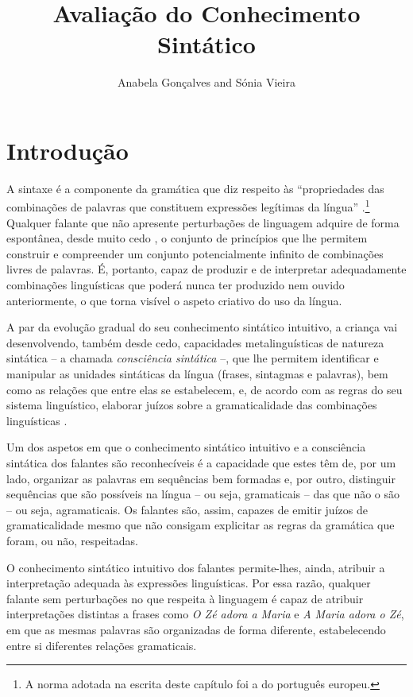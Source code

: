 \documentclass[output=paper,colorlinks,citecolor=brown,booklanguage=portuguese]{langscibook}
\title{Avaliação do Conhecimento Sintático}
\author{Anabela Gonçalves \affiliation{Universidade de Lisboa, Faculdade de Letras; Centro de Linguística da Universidade de Lisboa} and  Sónia Vieira \affiliation{University of Washington, Department of Speech and Hearing Sciences; Centro de Linguística da Universidade de Lisboa}}
\begin{document}
\maketitle

\section{Introdução}
A sintaxe é a componente da gramática que diz respeito às “propriedades das combinações de palavras que constituem expressões legítimas da língua” \citep[119]{Duarte2000}.\footnote{A norma adotada na escrita deste capítulo foi a do português europeu.}
Qualquer falante que não apresente perturbações de linguagem adquire de forma espontânea, desde muito cedo \citep{Guasti2002}, o conjunto de princípios que lhe permitem construir e compreender um conjunto potencialmente infinito de combinações livres de palavras. É, portanto, capaz de produzir e de interpretar adequadamente combinações linguísticas que poderá nunca ter produzido nem ouvido anteriormente, o que torna visível o aspeto criativo do uso da língua.

A par da evolução gradual do seu conhecimento sintático intuitivo, a criança vai desenvolvendo, também desde cedo, capacidades metalinguísticas de natureza sintática – a chamada \emph{consciência sintática} –, que lhe permitem identificar e manipular as unidades sintáticas da língua (frases, sintagmas e palavras), bem como as relações que entre elas se estabelecem, e, de acordo com as regras do seu sistema linguístico, elaborar juízos sobre a gramaticalidade das combinações linguísticas \citep{Perdigao2015, Costa2017}.  

Um dos aspetos em que o conhecimento sintático intuitivo e a consciência sintática dos falantes são reconhecíveis é a capacidade que estes têm de, por um lado, organizar as palavras em sequências bem formadas e, por outro, distinguir sequências que são possíveis na língua – ou seja, gramaticais – das que não o são – ou seja, agramaticais. Os falantes são, assim, capazes de emitir juízos de gramaticalidade mesmo que não consigam explicitar as regras da gramática que foram, ou não, respeitadas. 

O conhecimento sintático intuitivo dos falantes permite-lhes, ainda, atribuir a interpretação adequada às expressões linguísticas. Por essa razão, qualquer falante sem perturbações no que respeita à linguagem é capaz de atribuir interpretações distintas a frases como \emph{O Zé adora a Maria} e \emph{A Maria adora o Zé}, em que as mesmas palavras são organizadas de forma diferente, estabelecendo entre si diferentes relações gramaticais.
\end{document}
